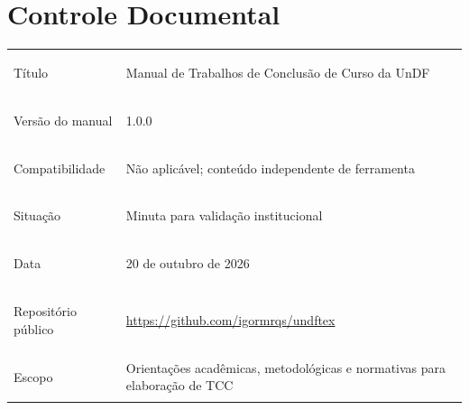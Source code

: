 \chapter*{Controle Documental}

\noindent\begin{tabularx}{\textwidth}{@{}>{\bfseries\raggedright\arraybackslash}p{}Y@{}}
\toprule
Título & Manual de Trabalhos de Conclusão de Curso da UnDF \\
Versão do manual & 1.0.0 \\
Compatibilidade & Não aplicável; conteúdo independente de ferramenta \\
Situação & Minuta para validação institucional \\
Data & 20 de outubro de 2026 \\
Repositório público & \url{https://github.com/igormrqs/undftex} \\
Escopo & Orientações acadêmicas, metodológicas e normativas para elaboração de TCC \\
\bottomrule
\end{tabularx}
